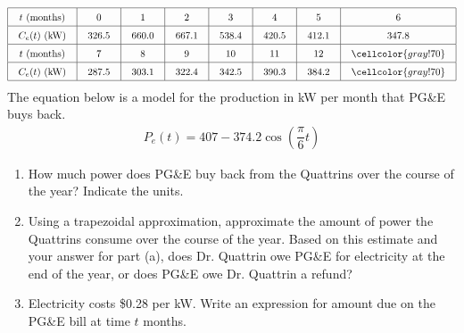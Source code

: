 \begin{align*}
    \arraycolsep=11pt\def\arraystretch{1.5}
    \begin{array}{|c|c|c|c|c|c|c|c|}
        \hline
        t \text{ (months)} & 0 & 1 & 2 & 3 & 4 & 5 & 6 \\ \hline
        C_e(t) \text{ (kW)} & 326.5 & 660.0 & 667.1 & 538.4 & 420.5 & 412.1 & 347.8 \\ \hline
        t \text{ (months)} & 7 & 8 & 9 & 10 & 11 & 12 & \cellcolor{gray!70} \\ \hline
        C_e(t) \text{ (kW)} & 287.5 & 303.1 & 322.4 & 342.5 & 390.3 & 384.2 & \cellcolor{gray!70} \\
        \hline 
    \end{array}
\end{align*}
The equation below is a model for the production in kW per month that PG\&E buys back. \begin{align*}
    P_e(t) = 407 - 374.2\cos\left(\dfrac{\pi}{6}t\right)
\end{align*}
\begin{enumerate}[label=\hspace{11pt}(\alph*), align=left, leftmargin=*, labelsep=0.25em]
    \item How much power does PG\&E buy back from the Quattrins over the course of the year? Indicate the units.
    \item Using a trapezoidal approximation, approximate the amount of power the Quattrins consume over the course of the year. Based on this estimate and your answer for part (a), does Dr. Quattrin owe PG\&E for electricity at the end of the year, or does PG\&E owe Dr. Quattrin a refund?
    \item Electricity costs \$0.28 per kW. Write an expression for amount due on the PG\&E bill at time $t$ months.
\end{enumerate} \vspace{11pt}

